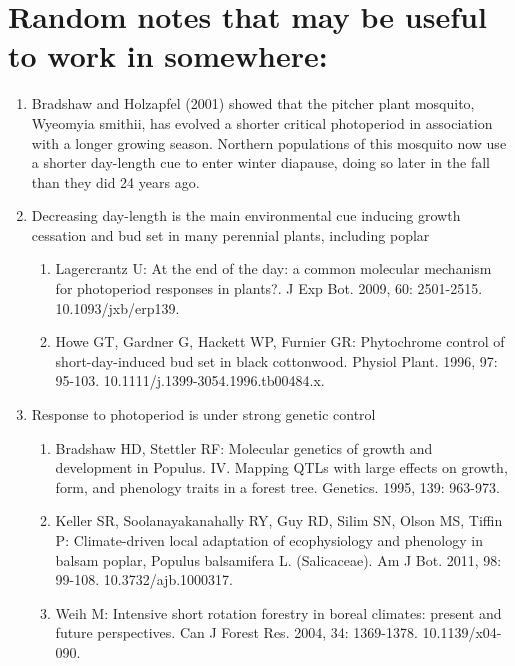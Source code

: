 \documentclass{article}
\begin{document}
\section* {Random notes that may be useful to work in somewhere:}
\begin {enumerate}
\item Bradshaw and Holzapfel (2001) showed that the pitcher plant mosquito,
Wyeomyia smithii, has evolved a shorter critical photoperiod in association with a
longer growing season. Northern populations of this mosquito now use a shorter
day-length cue to enter winter diapause, doing so later in the fall than they did
24 years ago.
\item Decreasing day-length is the main environmental cue inducing growth cessation and bud set in many perennial plants, including poplar 
\begin{enumerate}

\item Lagercrantz U: At the end of the day: a common molecular mechanism for photoperiod responses in plants?. J Exp Bot. 2009, 60: 2501-2515. 10.1093/jxb/erp139.
\item Howe GT, Gardner G, Hackett WP, Furnier GR: Phytochrome control of short-day-induced bud set in black cottonwood. Physiol Plant. 1996, 97: 95-103. 10.1111/j.1399-3054.1996.tb00484.x.
\end{enumerate}

\item Response to photoperiod is under strong genetic control %
\begin{enumerate}
\item Bradshaw HD, Stettler RF: Molecular genetics of growth and development in Populus. IV. Mapping QTLs with large effects on growth, form, and phenology traits in a forest tree. Genetics. 1995, 139: 963-973.
\item Keller SR, Soolanayakanahally RY, Guy RD, Silim SN, Olson MS, Tiffin P: Climate-driven local adaptation of ecophysiology and phenology in balsam poplar, Populus balsamifera L. (Salicaceae). Am J Bot. 2011, 98: 99-108. 10.3732/ajb.1000317.
\item Weih M: Intensive short rotation forestry in boreal climates: present and future perspectives. Can J Forest Res. 2004, 34: 1369-1378. 10.1139/x04-090.
\end{enumerate}
\end {enumerate}

\clearpage
\end{document}
